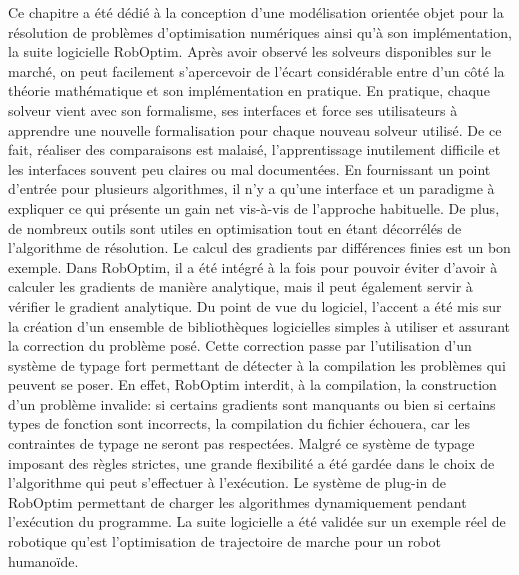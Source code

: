Ce chapitre a été dédié à la conception d'une modélisation orientée
objet pour la résolution de problèmes d'optimisation numériques ainsi
qu'à son implémentation, la suite logicielle RobOptim. Après avoir
observé les solveurs disponibles sur le marché, on peut facilement
s'apercevoir de l'écart considérable entre d'un côté la théorie
mathématique et son implémentation en pratique. En pratique, chaque
solveur vient avec son formalisme, ses interfaces et force ses
utilisateurs à apprendre une nouvelle formalisation pour chaque
nouveau solveur utilisé. De ce fait, réaliser des comparaisons est
malaisé, l'apprentissage inutilement difficile et les interfaces
souvent peu claires ou mal documentées. En fournissant un point
d'entrée pour plusieurs algorithmes, il n'y a qu'une interface et un
paradigme à expliquer ce qui présente un gain net vis-à-vis de
l'approche habituelle. De plus, de nombreux outils sont utiles en
optimisation tout en étant décorrélés de l'algorithme de
résolution. Le calcul des gradients par différences finies est un bon
exemple. Dans RobOptim, il a été intégré à la fois pour pouvoir éviter
d'avoir à calculer les gradients de manière analytique, mais il peut
également servir à vérifier le gradient analytique. Du point de vue du
logiciel, l'accent a été mis sur la création d'un ensemble de
bibliothèques logicielles simples à utiliser et assurant la correction
du problème posé. Cette correction passe par l'utilisation d'un
système de typage fort permettant de détecter à la compilation les
problèmes qui peuvent se poser. En effet, RobOptim interdit, à la
compilation, la construction d'un problème invalide: si certains
gradients sont manquants ou bien si certains types de fonction sont
incorrects, la compilation du fichier échouera, car les contraintes de
typage ne seront pas respectées. Malgré ce système de typage imposant
des règles strictes, une grande flexibilité a été gardée dans le choix
de l'algorithme qui peut s'effectuer à l'exécution. Le système de
plug-in de RobOptim permettant de charger les algorithmes
dynamiquement pendant l'exécution du programme. La suite logicielle a
été validée sur un exemple réel de robotique qu'est l'optimisation de
trajectoire de marche pour un robot humanoïde.
